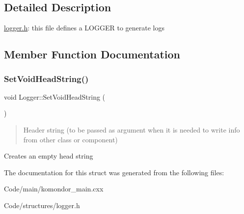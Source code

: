 \subsection{Detailed Description}
\hyperlink{logger_8h_source}{logger.\+h}\+: this file defines a L\+O\+G\+G\+ER to generate logs 

\subsection{Member Function Documentation}
\mbox{\label{structLogger_a31e093f2753510cacc169d8169221f01}} 
\subsubsection{\texorpdfstring{Set\+Void\+Head\+String()}{SetVoidHeadString()}}
{\footnotesize\ttfamily void Logger\+::\+Set\+Void\+Head\+String (\begin{DoxyParamCaption}{ }\end{DoxyParamCaption})\hspace{0.3cm}{\ttfamily [inline]}}



\begin{quote}
Header string (to be passed as argument when it is needed to write info from other class or component) \end{quote}


Creates an empty head string 

The documentation for this struct was generated from the following files\+:\begin{DoxyCompactItemize}
\item 
Code/main/komondor\+\_\+main.\+cxx\item 
Code/structures/logger.\+h\end{DoxyCompactItemize}
